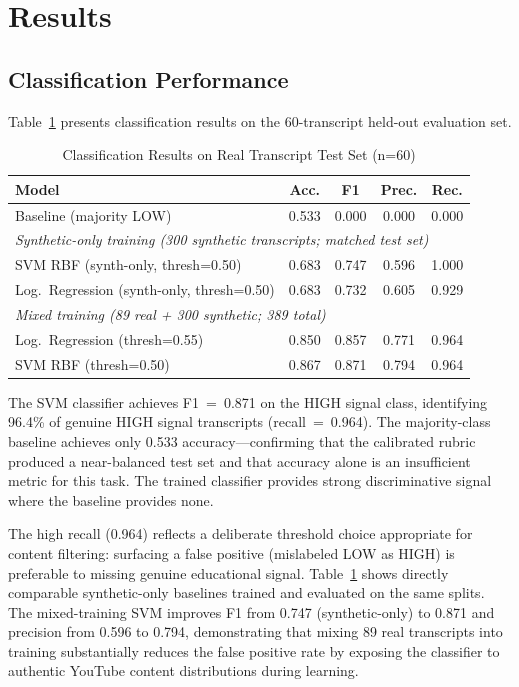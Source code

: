 \documentclass[11pt,a4paper]{article}
\begin{document}
\section{Results}

\subsection{Classification Performance}

Table~\ref{tab:results} presents classification results on the 60-transcript held-out evaluation
set.

\begin{table}[h]
\centering
\caption{Classification Results on Real Transcript Test Set (n=60)}
\label{tab:results}
\begin{tabular}{lcccc}
\toprule
Model & Acc. & F1 & Prec. & Rec. \\
\midrule
Baseline (majority LOW) & 0.533 & 0.000 & 0.000 & 0.000 \\
\midrule
\multicolumn{5}{l}{\textit{Synthetic-only training (300 synthetic transcripts; matched test set)}} \\
SVM RBF (synth-only, thresh=0.50) & 0.683 & 0.747 & 0.596 & 1.000 \\
Log.\ Regression (synth-only, thresh=0.50) & 0.683 & 0.732 & 0.605 & 0.929 \\
\midrule
\multicolumn{5}{l}{\textit{Mixed training (89 real + 300 synthetic; 389 total)}} \\
Log.\ Regression (thresh=0.55) & 0.850 & 0.857 & 0.771 & 0.964 \\
SVM RBF (thresh=0.50) & 0.867 & 0.871 & 0.794 & 0.964 \\
\bottomrule
\end{tabular}
\end{table}

The SVM classifier achieves F1~=~0.871 on the HIGH signal class, identifying 96.4\% of genuine
HIGH signal transcripts (recall~=~0.964). The majority-class baseline achieves only 0.533
accuracy---confirming that the calibrated rubric produced a near-balanced test set and that
accuracy alone is an insufficient metric for this task. The trained classifier provides strong
discriminative signal where the baseline provides none.

The high recall (0.964) reflects a deliberate threshold choice appropriate for content
filtering: surfacing a false positive (mislabeled LOW as HIGH) is preferable to missing genuine
educational signal. Table~\ref{tab:results} shows directly comparable synthetic-only baselines
trained and evaluated on the same splits. The mixed-training SVM improves F1 from 0.747
(synthetic-only) to 0.871 and precision from 0.596 to 0.794, demonstrating that mixing 89 real
transcripts into training substantially reduces the false positive rate by exposing the
classifier to authentic YouTube content distributions during learning.
\end{document}
